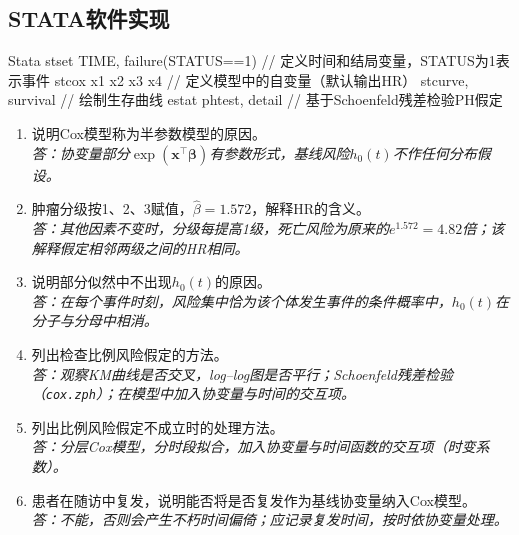 \subsection{STATA软件实现}
\par\noindent
\begin{coursecode}{Stata}
stset TIME, failure(STATUS==1) // 定义时间和结局变量，STATUS为1表示事件
stcox x1 x2 x3 x4                // 定义模型中的自变量（默认输出HR）
stcurve, survival                // 绘制生存曲线
estat phtest, detail             // 基于Schoenfeld残差检验PH假定
\end{coursecode}
\par

\begin{fuxi}[复习题]
\begin{enumerate}
\item 说明Cox模型称为半参数模型的原因。\\
\textit{答：协变量部分$\exp(\bm x^\top\bm\beta)$有参数形式，基线风险$h_0(t)$不作任何分布假设。}
\item 肿瘤分级按1、2、3赋值，$\widehat\beta=1.572$，解释HR的含义。\\
\textit{答：其他因素不变时，分级每提高1级，死亡风险为原来的$e^{1.572}=4.82$倍；该解释假定相邻两级之间的HR相同。}
\item 说明部分似然中不出现$h_0(t)$的原因。\\
\textit{答：在每个事件时刻，风险集中恰为该个体发生事件的条件概率中，$h_0(t)$在分子与分母中相消。}
\item 列出检查比例风险假定的方法。\\
\textit{答：观察KM曲线是否交叉，log--log图是否平行；Schoenfeld残差检验（\texttt{cox.zph}）；在模型中加入协变量与时间的交互项。}
\item 列出比例风险假定不成立时的处理方法。\\
\textit{答：分层Cox模型，分时段拟合，加入协变量与时间函数的交互项（时变系数）。}
\item 患者在随访中复发，说明能否将是否复发作为基线协变量纳入Cox模型。\\
\textit{答：不能，否则会产生不朽时间偏倚；应记录复发时间，按时依协变量处理。}
\end{enumerate}
\end{fuxi}
